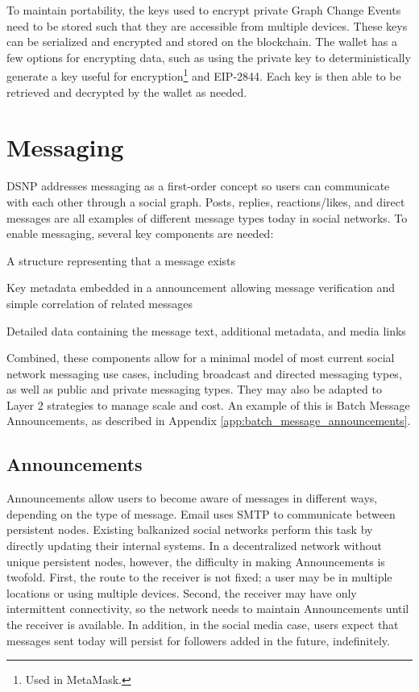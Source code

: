 \documentclass[12pt,letterpaper]{article}
\providecommand{\tightlist}{%
\setlength{\itemsep}{0pt}\setlength{\parskip}{0pt}}
\begin{document}
To maintain portability, the keys used to encrypt private Graph Change Events need to be
stored such that they are accessible from multiple devices. These keys can be serialized
and encrypted and stored on the blockchain. The wallet has a few options for encrypting
data, such as using the private key to deterministically generate a key useful for
encryption\footnote{Used in MetaMask.\cite{metamask_doc}} and EIP-2844.\cite{eip2844} Each
key is then able to be retrieved and decrypted by the wallet as needed.

\section{Messaging}\label{sec:messaging}

DSNP addresses messaging as a first-order concept so users can communicate with each other
through a social graph. Posts, replies, reactions/likes, and direct messages are all
examples of different message types today in social networks. To enable messaging, several
key components are needed:

\begin{samepage}
	\begin{description}
		\tightlist
		\item[Announcement:]
		      A structure representing that a message exists
		\item[Announcement Metadata:]
		      Key metadata embedded in a announcement allowing
		      message verification and simple correlation of related messages
		\item[Content:]
		      Detailed data containing the message text, additional metadata, and media links
	\end{description}
\end{samepage}

Combined, these components allow for a minimal model of most current social network
messaging use cases, including broadcast and directed messaging types, as well as public
and private messaging types. They may also be adapted to Layer 2 strategies to manage
scale and cost. An example of this is Batch Message Announcements, as described in
Appendix \ref{app:batch_message_announcements}.

\subsection{Announcements}\label{sec:announcements}

Announcements allow users to become aware of messages in different ways, depending on the
type of message. Email uses SMTP to communicate between persistent nodes. Existing
balkanized social networks perform this task by directly updating their internal systems.
In a decentralized network without unique persistent nodes, however, the difficulty in
making Announcements is twofold. First, the route to the receiver is not fixed; a user may
be in multiple locations or using multiple devices. Second, the receiver may have only
intermittent connectivity, so the network needs to maintain Announcements until the
receiver is available. In addition, in the social media case, users expect that messages
sent today will persist for followers added in the future, indefinitely.
\end{document}
